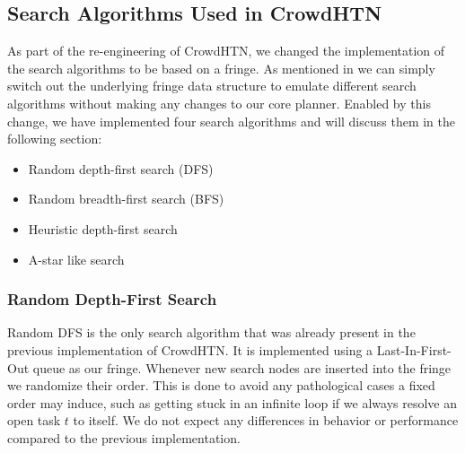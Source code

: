 \subsection{Search Algorithms Used in CrowdHTN}
\label{improv: search algorithms}
As part of the re-engineering of CrowdHTN, we changed the implementation of the search algorithms to be based on a fringe. As mentioned in \cite{holler2020htn} we can simply switch out the underlying fringe data structure to emulate different search algorithms without making any changes to our core planner. Enabled by this change, we have implemented four search algorithms and will discuss them in the following section:
\begin{itemize}
	\item Random depth-first search (DFS)
	\item Random breadth-first search (BFS)
	\item Heuristic depth-first search
	\item A-star like search
\end{itemize}

\subsubsection{Random Depth-First Search}
Random DFS is the only search algorithm that was already present in the previous implementation of CrowdHTN. It is implemented using a Last-In-First-Out queue as our fringe. Whenever new search nodes are inserted into the fringe we randomize their order. This is done to avoid any pathological cases a fixed order may induce, such as getting stuck in an infinite loop if we always resolve an open task $t$ to itself. We do not expect any differences in behavior or performance compared to the previous implementation.

